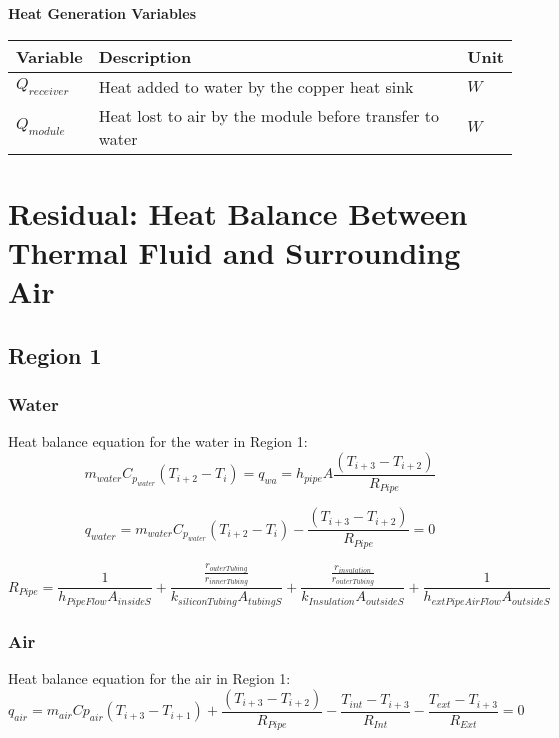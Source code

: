 \documentclass[12pt]{report}
\begin{document}
\begin{center}
	\textbf{Heat Generation Variables}
	\begin{tabular}{| l | l | l |}
		\hline
		Variable & Description & Unit  \\ \hline
		$Q_{receiver}$ & Heat added to water by the copper heat sink & $W$ \\ \hline
		$Q_{module}$ & Heat lost to air by the module before transfer to water & $W$ \\ \hline
	\end{tabular}
\end{center}

\section{Residual: Heat Balance Between Thermal Fluid and Surrounding Air}

\subsection{Region 1}
\subsubsection{Water}
Heat balance equation for the water in Region 1:
$$ m_{water} C_{p_{water}} (T_{i+2}-T_i) = q_{wa} = h_{pipe} A \frac
{\left( 
	T_{i+3} - T_{i+2}
	\right)}
{R_{Pipe}} $$

\begin{equation}
\boxed{q_{water} = m_{water} C_{p_{water}} (T_{i+2}-T_i) - 
		\frac
			{\left( 
				T_{i+3} - T_{i+2}
			\right)}
		{R_{Pipe}}
		= 0 }
\end{equation}

$$ R_{Pipe} = 
	\frac{1}
	{h_{PipeFlow} A_{insideS}} 
	+ \frac{
		\frac{r_{outerTubing}}
		{r_{innerTubing}}
		}
		{k_{siliconTubing} A_{tubingS}} 
	+ \frac{
		\frac{r_{insulation}}
		{r_{outerTubing}}
		}
		{k_{Insulation} A_{outsideS}} 
	+ \frac{1}
	{h_{extPipeAirFlow} A_{outsideS}} $$

\subsubsection{Air}
Heat balance equation for the air in Region 1:
\begin{equation}
\boxed{q_{air} = m_{air} Cp_{air} (T_{i+3}-T_{i+1}) 
	+ \frac{
		\left( 
			T_{i+3}
			- T_{i+2}
		\right)}
		{R_{Pipe}} 
	- \frac{T_{int} - T_{i+3}}{R_{Int}}
	- \frac{T_{ext} - T_{i+3}}{R_{Ext}} = 0}
\end{equation}
	
\end{document}
